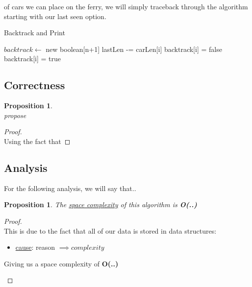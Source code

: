 \documentclass[12pt]{article}
\newtheorem{proposition}[theorem]{Proposition}
\begin{document}
of cars we can place on the ferry, we will simply traceback through the algorithm
starting with our last seen option.
\begin{algorithm}[H]
\caption{Backtrack and Print}
\begin{algorithmic}
        \State $backtrack \gets$ new boolean[n+1]
                \State lastLen -= carLen[i]
                \State backtrack[i] = false
            \Else
                \State backtrack[i] = true
            \EndIf
        \EndFor
        \State {}
                \State {}
            \Else
                \State {}
            \EndIf
        \EndFor
    \EndProcedure
\end{algorithmic}
\end{algorithm}

\subsection{Correctness}
\begin{proposition}
~ \\ \indent propose
\end{proposition}

\begin{proof}
~ \\ \indent Using the fact that 
\end{proof}


\subsection{Analysis}
For the following analysis, we will say that..

\begin{proposition}
\label{numq}
The \underline{space complexity} of this algorithm is \textbf{O(..)}
\end{proposition}

\begin{proof}
~ \\ \indent This is due to the fact that all of our data is stored in data structures:
\begin{itemize}
    \item \underline{cause}: reason $\implies complexity$
\end{itemize}
\begin{center}
    Giving us a space complexity of \textbf{O(..)}
\end{center}
\end{proof}
\end{document}

